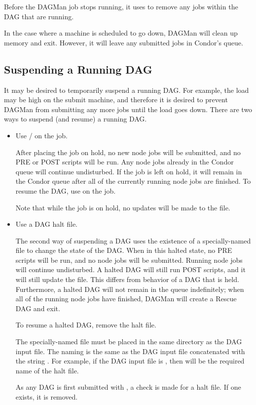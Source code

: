 Before the DAGMan job stops running, it uses 
to remove any jobs within the DAG that are running.

In the case where a
machine is scheduled to go down,
DAGMan will clean up memory and exit.
However, it will leave any submitted jobs
in Condor's queue.

\subsection{\label{sec:DagSuspend}Suspending a Running DAG}

It may be desired to temporarily suspend a running DAG.
For example, the load may be high on the submit machine,
and therefore it is desired to prevent DAGMan from
submitting any more jobs until the load goes down.
There are two ways to suspend (and resume) a running DAG.

\begin{itemize}
\item Use / on the  job.

After placing the  job on hold,
no new node jobs will be submitted,
and no PRE or POST scripts will be run.
Any node jobs already in the Condor queue will continue undisturbed.
If the  job is left on hold,
it will remain in the Condor queue after all of the currently running
node jobs are finished.
To resume the DAG, use  on the  job.

Note that while the  job is on hold,
no updates will be made to the  file.

\item Use a DAG halt file.

The second way of suspending a DAG uses the existence of a specially-named
file to change the state of the DAG.
When in this halted state,
no PRE scripts will be run, and no node jobs will be submitted.  
Running node jobs will continue undisturbed.
A halted DAG will still run POST scripts,
and it will still update the  file.
This differs from behavior of a DAG that is held.
Furthermore, a halted DAG will not remain in the queue indefinitely;
when all of the running node jobs have finished, 
DAGMan will create a Rescue DAG and exit.

To resume a halted DAG, remove the halt file.

The specially-named file must be placed in the same directory
as the DAG input file.
The naming is the same as the DAG input file concatenated with the
string .
For example, if the DAG input file is , 
then  will be the required name of the halt file.

As any DAG is first submitted with , 
a check is made for a halt file.
If one exists, it is removed.
\end{itemize}

